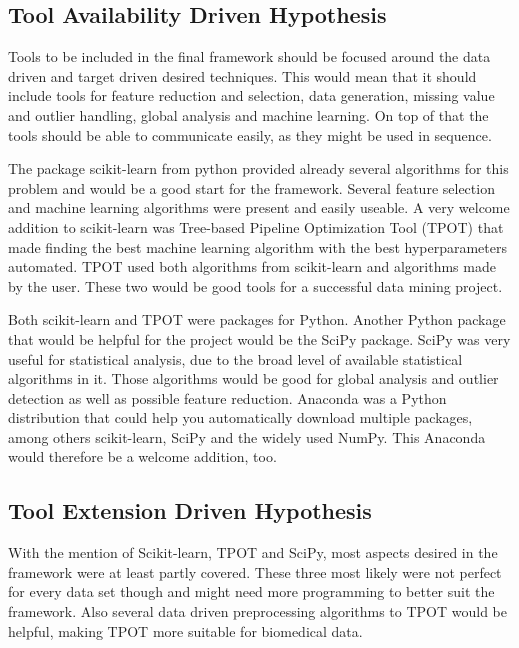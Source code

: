\documentclass[10pt,a4paper]{article}
\begin{document}
	\subsection{Tool Availability Driven Hypothesis}
	\label{subsec:ToolAvailabilityDrivenHypothesis}
	
	Tools to be included in the final framework should be focused around the data driven and target driven desired techniques. This would mean that it should include tools for feature reduction and selection, data generation, missing value and outlier handling, global analysis and machine learning. On top of that the tools should be able to communicate easily, as they might be used in sequence.
	
	The package scikit-learn from python provided already several algorithms for this problem and would be a good start for the framework. Several feature selection and machine learning algorithms were present and easily useable. A very welcome addition to scikit-learn was Tree-based Pipeline Optimization Tool (TPOT) that made finding the best machine learning algorithm with the best hyperparameters automated. TPOT used both algorithms from scikit-learn and algorithms made by the user. These two would be good tools for a successful data mining project.
	
	Both scikit-learn and TPOT were packages for Python. Another Python package that would be helpful for the project would be the SciPy package. SciPy was very useful for statistical analysis, due to the broad level of available statistical algorithms in it. Those algorithms would be good for global analysis and outlier detection as well as possible feature reduction. Anaconda was a Python distribution that could help you automatically download multiple packages, among others scikit-learn, SciPy and the widely used NumPy. This Anaconda would therefore be a welcome addition, too.
	
	\subsection{Tool Extension Driven Hypothesis}
	\label{subsec:ToolExtensionDrivenHypothesis}
	
	With the mention of Scikit-learn, TPOT and SciPy, most aspects desired in the framework were at least partly covered. These three most likely were not perfect for every data set though and might need more programming to better suit the framework. Also several data driven preprocessing algorithms to TPOT would be helpful, making TPOT more suitable for biomedical data. 
	
\end{document}
